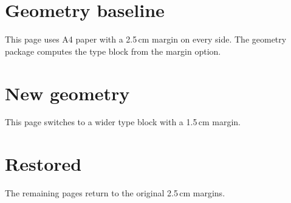 \documentclass{article}
\begin{document}
\section{Geometry baseline}
This page uses A4 paper with a 2.5\,cm margin on every side.
The geometry package computes the type block from the margin option.
\section{New geometry}
This page switches to a wider type block with a 1.5\,cm margin.
\restoregeometry
\section{Restored}
The remaining pages return to the original 2.5\,cm margins.
\end{document}
